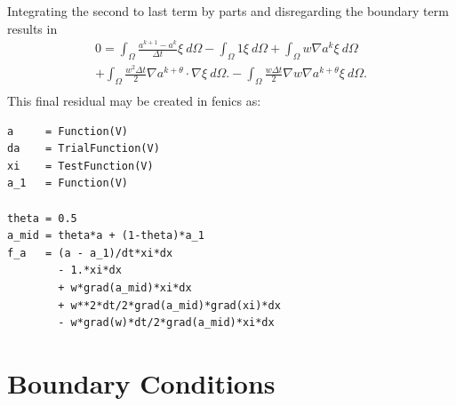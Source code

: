 \documentclass{article}%
\begin{document}
Integrating the second to last term by parts and disregarding the boundary term results in
\begin{align*}
  0 = \int_{\Omega} \frac{a^{k+1} - a^{k}}{\Delta t}\xi\ d\Omega - 
      \int_{\Omega} 1\xi\ d\Omega
  + \int_{\Omega} w \nabla{a}^k \xi\ d\Omega \\
  + \int_{\Omega} \frac{w^2 \Delta t}{2} 
    \nabla a^{k+\theta} \cdot \nabla \xi\ d\Omega.
  - \int_{\Omega} \frac{w \Delta t}{2} 
    \nabla w \nabla a^{k+\theta} \xi\ d\Omega.\\
\end{align*}
This final residual may be created in fenics as:

\footnotesize
\begin{verbatim}
a     = Function(V)
da    = TrialFunction(V)
xi    = TestFunction(V)
a_1   = Function(V)

theta = 0.5
a_mid = theta*a + (1-theta)*a_1
f_a   = (a - a_1)/dt*xi*dx 
        - 1.*xi*dx 
        + w*grad(a_mid)*xi*dx 
        + w**2*dt/2*grad(a_mid)*grad(xi)*dx 
        - w*grad(w)*dt/2*grad(a_mid)*xi*dx
\end{verbatim}
\normalsize


\section{Boundary Conditions}
\end{document}
